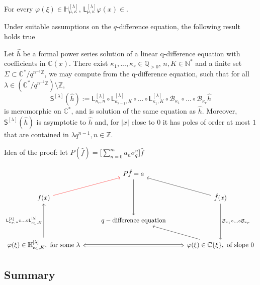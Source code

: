 \documentclass[11pt,a4paper,twoside,leqno,noamsfonts]{amsart}
\numberwithin{equation}{section}
\begin{document}
For every $\varphi(\xi)\in\mathbb{H}_{\mu,\kappa}^{[\lambda]}$, $\mathsf{L}_{\mu,\kappa}^[\lambda]\varphi(x)\in$. 

Under suitable assumptions on the $q$-difference equation, the following result holds true 
\begin{theorem}
Let $\hat{h}$ be a formal power series solution of a linear q-difference equation with coefficients in $\mathbb{C}(x)$. There exist $\kappa_1,...,\kappa_r\in\mathbb{Q}_{>0}$, $n,K\in\mathbb{N}^*$ and a finite set $\Sigma\subset\mathbb{C}^*/ q^{n^{-1}\mathbb{Z}}$, we may compute from the q-difference equation, such that for all $\lambda\in (\mathbb{C}^*/q^{n^{-1}\mathbb{Z}})\setminus\mathbb{Z} $,
\[
\mathsf{S}^{[\lambda]}(\hat{h}):=\mathsf{L}^{[\lambda]}_{\kappa_r,n}\circ\mathsf{L}^{[\lambda]}_{\kappa_{r-1},K}\circ...\circ\mathsf{L}^{[\lambda]}_{\kappa_1,K}\circ\mathcal{B}_{\kappa_1}\circ...\circ\mathcal{B}_{\kappa_r}\hat{h}\]
is meromorphic on $\mathbb{C}^*$, and is solution of the same equation as $\hat{h}$. Moreover, $\mathsf{S}^{[\lambda]}(\hat{h})$ is asymptotic to $\hat{h}$ and, for $|x|$ close to $0$ it has poles of order at most $1$ that are contained in $\lambda q^{n-1}, n\in\mathbb{Z}$. 
\end{theorem}

Idea of the proof: let $P(\hat{f})=\big[\sum_{n=0}^ma_n\sigma_q^n\big]\hat{f}$

\[
\begin{tikzcd}
& P\hat{f}=a\arrow[dd] & \\
f(x)\arrow[ru,red] & &\hat{f}(x)\arrow[lu]\arrow[dd, "\mathcal{B}_{\kappa_1}\circ...\circ\mathcal{B}_{\kappa_r}"] \\
& q-\text{difference equation} & \\
\varphi(\xi)\in\mathbb{H}^{[\lambda]}_{\kappa_1,K}, \text{ for some }\lambda \arrow[uu,  "\mathsf{L}^{[\lambda]}_{\kappa_r,n}\circ...\circ\mathsf{L}^{[\lambda]}_{\kappa_1,K}"]& & \varphi(\xi)\in\C\lbrace\xi\rbrace, \text{ of slope } 0 \arrow[ll,Leftrightarrow]\arrow[ul] 
\end{tikzcd}
\]

\subsection{Summary}
\end{document}
